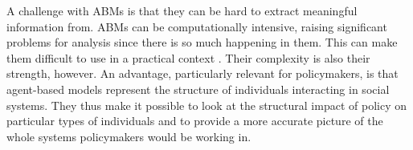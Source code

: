 




A challenge with ABMs is that they can be hard to extract meaningful information from. ABMs can be computationally intensive, raising significant problems for analysis since there is so much happening in them. This can make them difficult to use in a practical context \cite{banksStatisticalChallengesAgentBased2021}. %
% 
Their complexity is also their strength, however. An advantage, particularly relevant for policymakers, is that agent-based models represent the structure of individuals interacting in social systems. %
They thus make it possible to look at the structural impact of policy on particular types of individuals and to provide a more accurate picture of the whole systems policymakers would be working in.




